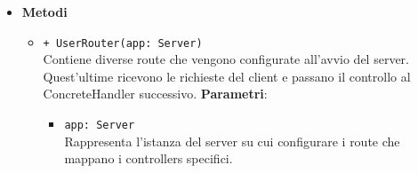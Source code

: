 \begin{itemize}
		\item \textbf{Metodi} 
		\begin{itemize}
		\item 
		\texttt{+ UserRouter(app: Server)} \\
		Contiene diverse route che vengono configurate all’avvio del server. Quest’ultime ricevono le richieste del client e passano il controllo al ConcreteHandler successivo.
		\textbf{Parametri}:
			\begin{itemize}
				\item 
				\texttt{app: Server} \\
				Rappresenta l’istanza del server su cui configurare i route che mappano i controllers specifici.
			\end{itemize}
		\end{itemize}
\end{itemize}		
